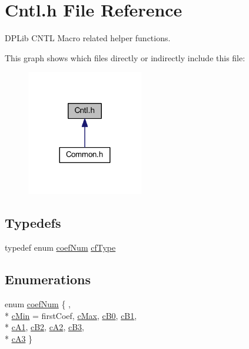 \hypertarget{a00014}{\section{Cntl.\-h File Reference}
\label{a00014}
}


D\-P\-Lib C\-N\-T\-L Macro related helper functions.  


This graph shows which files directly or indirectly include this file\-:\nopagebreak
\begin{figure}[H]
\begin{center}
\leavevmode
\includegraphics[width=144pt]{a00061}
\end{center}
\end{figure}
\subsection*{Typedefs}
\begin{DoxyCompactItemize}
\item 
typedef enum \hyperlink{a00014_a4b8f446b389413b175ff4d4dbcd18da1}{coef\-Num} \hyperlink{a00014_ac340fbbc5919954c173757935549588f}{cf\-Type}
\end{DoxyCompactItemize}
\subsection*{Enumerations}
\begin{DoxyCompactItemize}
\item 
enum \hyperlink{a00014_a4b8f446b389413b175ff4d4dbcd18da1}{coef\-Num} \{ , \\*
\hyperlink{a00014_a4b8f446b389413b175ff4d4dbcd18da1ad15b967851188a21b2d4fd326304bf83}{c\-Min} = first\-Coef, 
\hyperlink{a00014_a4b8f446b389413b175ff4d4dbcd18da1a3576a9eb4b8f9d1ca3d31a0f9b889299}{c\-Max}, 
\hyperlink{a00014_a4b8f446b389413b175ff4d4dbcd18da1a3dec162fc3f68f49f43775eba612e110}{c\-B0}, 
\hyperlink{a00014_a4b8f446b389413b175ff4d4dbcd18da1a43986b141584b760c8c8c9fc29304de2}{c\-B1}, 
\\*
\hyperlink{a00014_a4b8f446b389413b175ff4d4dbcd18da1aac28a7344b33c5e968a79fc27078da99}{c\-A1}, 
\hyperlink{a00014_a4b8f446b389413b175ff4d4dbcd18da1a5229cb73bab727c5aeaae425a4fd2472}{c\-B2}, 
\hyperlink{a00014_a4b8f446b389413b175ff4d4dbcd18da1a80d8d6d72b42fa8603b71cba71e13ef2}{c\-A2}, 
\hyperlink{a00014_a4b8f446b389413b175ff4d4dbcd18da1aaf02fe4d8a1a90d96d8ceb29c6face14}{c\-B3}, 
\\*
\hyperlink{a00014_a4b8f446b389413b175ff4d4dbcd18da1a23a7967c17fd0f99330009d84750ff62}{c\-A3}
 \}
\end{DoxyCompactItemize}
